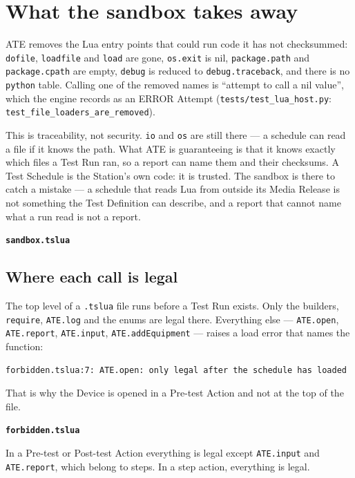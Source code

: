\chapter{What the sandbox takes away}\label{ch:sandbox}

ATE removes the Lua entry points that could run code it has not checksummed:
\texttt{dofile}, \texttt{loadfile} and \texttt{load} are gone, \texttt{os.exit} is nil,
\texttt{package.path} and \texttt{package.cpath} are empty, \texttt{debug} is reduced to
\texttt{debug.traceback}, and there is no \texttt{python} table. Calling one of the removed names is
``attempt to call a nil value'', which the engine records as an ERROR Attempt
(\texttt{tests/\allowbreak{}test\_\allowbreak{}lua\_\allowbreak{}host.py}:
\texttt{test\_\allowbreak{}file\_\allowbreak{}loaders\_\allowbreak{}are\_\allowbreak{}removed}).

This is traceability, not security. \texttt{io} and \texttt{os} are still there --- a schedule
can read a file if it knows the path. What ATE is guaranteeing is that it knows exactly which
files a Test Run ran, so a report can name them and their checksums. A Test Schedule is the
Station's own code: it is trusted. The sandbox is there to catch a mistake --- a schedule that
reads Lua from outside its Media Release is not something the Test Definition can describe, and
a report that cannot name what a run read is not a report.

\noindent\textbf{\texttt{sandbox.tslua}}\par


\section{Where each call is legal}

The top level of a \texttt{.tslua} file runs before a Test Run exists. Only the builders,
\texttt{require}, \texttt{ATE.log} and the enums are legal there. Everything else ---
\texttt{ATE.open}, \texttt{ATE.report}, \texttt{ATE.input}, \texttt{ATE.addEquipment} --- raises
a load error that names the function:

\begingroup\footnotesize
\begin{verbatim}
forbidden.tslua:7: ATE.open: only legal after the schedule has loaded
\end{verbatim}
\endgroup

That is why the Device is opened in a Pre-test Action and not at the top of the file.

\noindent\textbf{\texttt{forbidden.tslua}}\par


In a Pre-test or Post-test Action everything is legal except \texttt{ATE.input} and
\texttt{ATE.report}, which belong to steps. In a step action, everything is legal.

